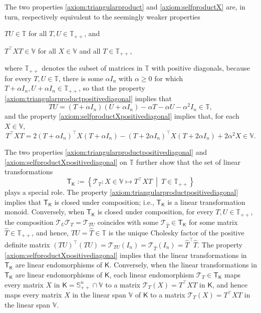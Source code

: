\documentclass[oneside]{amsart}
\theoremstyle{plain}
\theoremstyle{definition}
\theoremstyle{remark}
\numberwithin{equation}{section}
\begin{document}
The two properties \ref{axiom:triangularproduct} and
\ref{axiom:selfproductX} are, in turn, respectively equivalent to the
seemingly weaker properties
\begin{enumerate}[label={[U\arabic*\textsuperscript{+}]},
ref={[U\arabic*\textsuperscript{+}]}]
\item\label{axiom:triangularproductpositivediagonal}%
$T U \in \mathbb{T}$ for all $T, U \in \mathbb{T}_{++}$, and

\item\label{axiom:selfproductXpositivediagonal}%
$T^{\top} X T \in \mathbb{V}$ for all $X \in \mathbb{V}$ and all $T \in
\mathbb{T}_{++}$,

\end{enumerate}
where $\mathbb{T}_{++}$ denotes the subset of matrices in $\mathbb{T}$ with
positive diagonals, because for every $T, U \in \mathbb{T}$, there is some
$\alpha I_{n}$ with $\alpha \geq 0$ for which $T + \alpha I_{n}, U + \alpha
I_{n} \in \mathbb{T}_{++}$, so that the property
\ref{axiom:triangularproductpositivediagonal} implies that
\[
T U = (T + \alpha I_{n}) (U + \alpha I_{n}) - \alpha T - \alpha U -
\alpha^2 I_{n} \in \mathbb{T},
\]
and the property \ref{axiom:selfproductXpositivediagonal} implies that, for
each $X \in \mathbb{V}$,
\[
T^{\top} X T = 2 (T + \alpha I_{n})^{\top} X (T + \alpha I_{n}) - (T + 2
\alpha I_{n})^{\top} X (T + 2 \alpha I_{n}) + 2 \alpha^2 X \in \mathbb{V}.
\]

The two properties \ref{axiom:triangularproductpositivediagonal} and
\ref{axiom:selfproductXpositivediagonal} on $\mathbb{T}$ further show that
the set of linear transformations
\[
\mathsf{T}_{\mathsf{K}} := \left\{\mathcal{T}_{T} : X \in \mathbb{V}
\mapsto T^{\top} X T\ \middle|\ T \in \mathbb{T}_{++}\right\}
\]
plays a special role. The property
\ref{axiom:triangularproductpositivediagonal} implies that
$\mathsf{T}_{\mathsf{K}}$ is closed under composition; i.e.,
$\mathsf{T}_{\mathsf{K}}$ is a linear transformation monoid. Conversely,
when $\mathsf{T}_{\mathsf{K}}$ is closed under composition, for every $T, U
\in \mathbb{T}_{++}$, the composition $\mathcal{T}_{U} \mathcal{T}_{T} =
\mathcal{T}_{T U}$ coincides with some $\mathcal{T}_{\hat{T}} \in
\mathsf{T}_{\mathsf{K}}$ for some matrix $\hat{T} \in \mathbb{T}_{++}$, and
hence, $T U = \hat{T} \in \mathbb{T}$ is the unique Cholesky factor of the
positive definite matrix $(T U)^{\top} (T U) = \mathcal{T}_{T U}(I_{n}) =
\mathcal{T}_{\hat{T}}(I_{n}) = \hat{T}^{\top} \hat{T}$. The property
\ref{axiom:selfproductXpositivediagonal} implies that the linear
transformations in $\mathsf{T}_{\mathsf{K}}$ are linear endomorphisms of
$\mathsf{K}$. Conversely, when the linear transformations in
$\mathsf{T}_{\mathsf{K}}$ are linear endomorphisms of $\mathsf{K}$, each
linear endomorphism $\mathcal{T}_{T} \in \mathsf{T}_{\mathsf{K}}$ maps
every matrix $X$ in $\mathsf{K} = \mathbb{S}^{n}_{++} \cap \mathbb{V}$ to a
matrix $\mathcal{T}_{T}(X) = T^{\top} X T$ in $\mathsf{K}$, and hence maps
every matrix $X$ in the linear span $\mathbb{V}$ of $\mathsf{K}$ to a
matrix $\mathcal{T}_{T}(X) = T^{\top} X T$ in the linear span $\mathbb{V}$.
\end{document}
